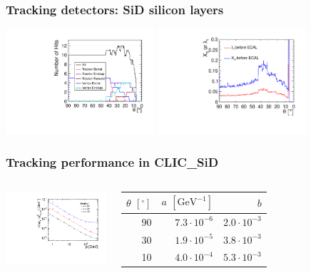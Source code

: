 \documentclass{beamer}
\begin{document}
\begin{frame}
\frametitle{Tracking detectors: SiD silicon layers}
\includegraphics[width=5.5cm]{CLIC_SiD_layers.pdf}
\includegraphics[width=5.5cm]{CGrefe_Fig6.pdf}
\end{frame}
\begin{frame}
\frametitle{Tracking performance in CLIC\_SiD}
\begin{columns}[c]
\column{6cm}
\includegraphics[width=5.5cm]{sid_singleMuonMomentumRes.pdf}
\column{5cm}
\begin{tabular}{r r r}\toprule
$\theta$ \footnotesize{$\left[ ^{\circ}\right]$} & $a$
\footnotesize{$\left[\mathrm{GeV}^{-1}\right]$} & $b$\\\midrule 90 & $7.3\cdot10^{-6}$ & $2.0\cdot10^{-3}$ \\
30 & $1.9\cdot10^{-5}$ & $3.8\cdot10^{-3}$ \\
10 & $4.0\cdot10^{-4}$ & $5.3\cdot10^{-3}$ \\\bottomrule
\end{tabular}
\end{columns}
\end{frame}
\end{document}

